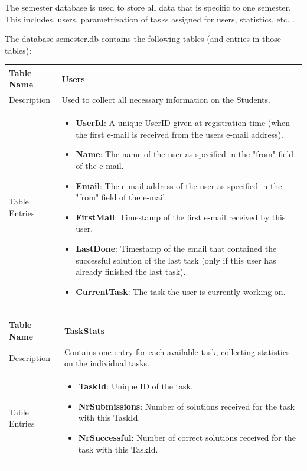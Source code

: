 The semester database is used to store all data that is specific to one semester. This includes,
users, parametrization of tasks assigned for users, statistics, etc. .

The database semester.db contains the following tables (and entries in those tables):

\begin{tabular}{|p{3cm}|p{10cm}|}
\hline
Table Name & Users \\
\hline
Description & Used to collect all necessary information on the Students.\\
\hline
Table Entries & \begin{itemize}
        \item {\bf UserId}: A unique UserID given at registration time (when the first e-mail
            is received from the users e-mail address).
        \item {\bf Name}: The name of the user as specified in the "from" field of the e-mail.
        \item {\bf Email}: The e-mail address of the user as specified in the "from" field of the
            e-mail.
        \item {\bf FirstMail}: Timestamp of the first e-mail received by this user.
        \item {\bf LastDone}: Timestamp of the email that contained the successful solution of the
            last task (only if this user has already finished the last task).
        \item {\bf CurrentTask}: The task the user is currently working on.
        \end{itemize} \\
\hline
\end{tabular}

\begin{tabular}{|p{3cm}|p{10cm}|}
\hline
Table Name & TaskStats \\
\hline
Description & Contains one entry for each available task, collecting statistics on the individual tasks.\\
\hline
Table Entries & \begin{itemize}
        \item {\bf TaskId}: Unique ID of the task.
        \item {\bf NrSubmissions}: Number of solutions received for the task with this TaskId.
        \item {\bf NrSuccessful}: Number of correct solutions received for the task with this TaskId.
        \end{itemize} \\
\hline
\end{tabular}

